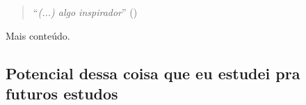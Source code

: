 \begin{refsection}
\begin{quote}
\enquote{\emph{(...) algo inspirador}} (\cite{Darwin1958})
\end{quote} 

Mais conteúdo.

\subsection{Potencial dessa coisa que eu estudei pra futuros estudos}


\renewcommand*{\bibfont}{\footnotesize}
\printbibliography[heading=bibintoc] %
\end{refsection}
